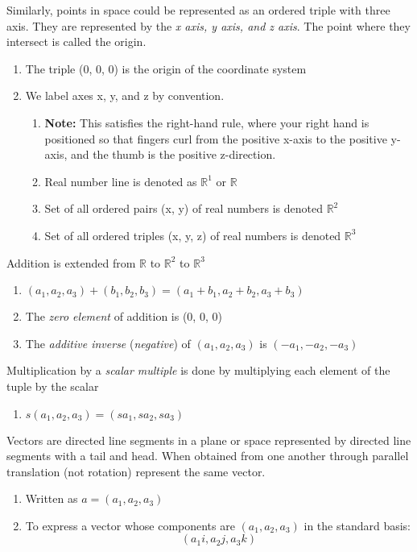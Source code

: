 \documentclass[12pt, letterpaper]{article}
\begin{document}
Similarly, points in space could be represented as an ordered triple with three axis. They are represented by the \textit{x axis, y axis, and z axis}. The point where they intersect is called the origin.
\begin{enumerate}
    \item The triple (0, 0, 0) is the origin of the coordinate system
    \item We label axes x, y, and z by convention.
    \begin{enumerate}
        \item \textbf{Note: }This satisfies the right-hand rule, where your right hand is positioned so that fingers curl from the positive x-axis to the positive y-axis, and the thumb is the positive z-direction.
        \item Real number line is denoted as \(\mathbb{R}^{1}\) or \(\mathbb{R}\)
        \item Set of all ordered pairs (x, y) of real numbers is denoted \(\mathbb{R}^{2}\)
        \item Set of all ordered triples (x, y, z) of real numbers is denoted \(\mathbb{R}^{3}\)
    \end{enumerate}
\end{enumerate}
Addition is extended from \(\mathbb{R}\) to \(\mathbb{R}^{2}\) to \(\mathbb{R}^{3}\)
\begin{enumerate}
    \item \((a_{1}, a_{2}, a_{3}) + (b_{1}, b_{2}, b_{3}) = (a_{1} + b_{1}, a_{2} + b_{2}, a_{3} + b_{3})\)
    \item The \textit{zero element} of addition is (0, 0, 0)
    \item The \textit{additive inverse} (\textit{negative}) of \((a_{1}, a_{2}, a_{3})\) is \((-a_{1}, -a_{2}, -a_{3})\)
\end{enumerate}
Multiplication by a \textit{scalar multiple} is done by multiplying each element of the tuple by the scalar
\begin{enumerate}
    \item \(s(a_{1},a_{2},a_{3}) = (sa_{1},sa_{2},sa_{3}) \)
\end{enumerate}
Vectors are directed line segments in a plane or space represented by directed line segments with a tail and head. When obtained from one another through parallel translation (not rotation) represent the same vector.
\begin{enumerate}
    \item Written as \(a = (a_{1}, a_{2}, a_{3}) \)
    \item To express a vector whose components are \((a_{1}, a_{2}, a_{3})\) in the standard basis: \[(a_{1}i, a_{2}j, a_{3}k)\]
\end{enumerate}
\end{document}
